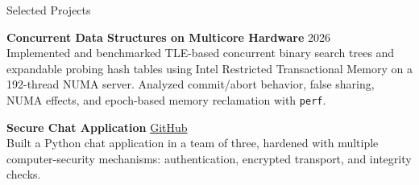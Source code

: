 \documentclass{resume}
\begin{document}
\begin{rSection}{Selected Projects}

\textbf{Concurrent Data Structures on Multicore Hardware} \hfill {2026} \\
Implemented and benchmarked TLE-based concurrent binary search trees and expandable probing hash tables using Intel
Restricted Transactional Memory on a 192-thread NUMA server. Analyzed commit/abort behavior, false sharing, NUMA effects,
and epoch-based memory reclamation with \texttt{perf}.



\textbf{Secure Chat Application} \hfill \href{https://github.com/rerfan24/DNS-project}{GitHub} \\
Built a Python chat application in a team of three, hardened with multiple computer-security mechanisms:
authentication, encrypted transport, and integrity checks.


\end{rSection}
\end{document}
